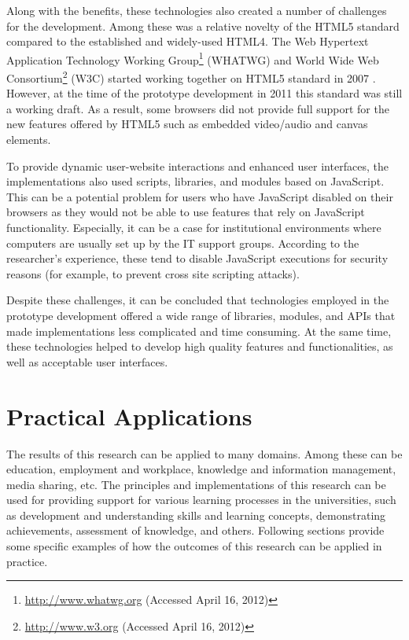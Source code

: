 Along with the benefits, these technologies also created a number of challenges
for the development. Among these was a relative novelty of the HTML5 standard
compared to the established and widely-used HTML4. The Web Hypertext Application
Technology Working Group\footnote{\url{http://www.whatwg.org} (Accessed April
16, 2012)} (WHATWG) and World Wide Web Consortium\footnote{\url{http://www.w3.org}  (Accessed April 16,
2012)} (W3C) started working together on HTML5 standard in 2007
\citep{WorldWideWebConsortium2012}. However, at the time of the prototype
development in 2011 this standard was still a working draft. As a result, some
browsers did not provide full support for the new features offered by HTML5 such
as embedded video/audio and canvas elements.

To provide dynamic user-website interactions and enhanced user interfaces, the
implementations also used scripts, libraries, and modules based on
JavaScript. This can be a potential problem for users who have JavaScript
disabled on their browsers as they would not be able to use features that rely
on JavaScript functionality. Especially, it can be a case for institutional
environments where computers are usually set up by the IT support groups.
According to the researcher's experience, these tend to disable JavaScript
executions for security reasons (for example, to prevent cross site scripting
attacks).

Despite these challenges, it can be concluded that technologies employed in the
prototype development offered a wide range of libraries, modules, and APIs
that made implementations less complicated and time consuming. At the same time,
these technologies helped to develop high quality features and functionalities,
as well as acceptable user interfaces.

\section{Practical Applications}
The results of this research can be applied to many domains. Among these can be
education, employment and workplace, knowledge and information management, media
sharing, etc. The principles and implementations of this research can be used
for providing support for various learning processes in the universities, such
as development and understanding skills and learning concepts, demonstrating
achievements, assessment of knowledge, and others. Following sections provide
some specific examples of how the outcomes of this research can be applied in
practice.

